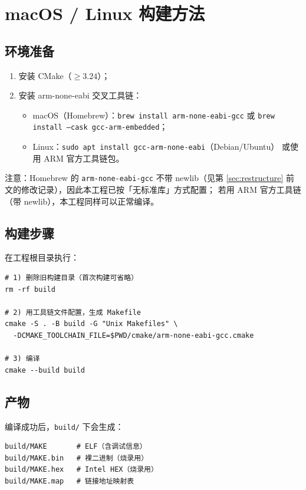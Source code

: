 \section{macOS / Linux 构建方法}

\subsection{环境准备}

\begin{enumerate}
  \item 安装 CMake（$\geq 3.24$）；
  \item 安装 arm-none-eabi 交叉工具链：
    \begin{itemize}
      \item macOS（Homebrew）：\texttt{brew install arm-none-eabi-gcc}
            或 \texttt{brew install --cask gcc-arm-embedded}；
      \item Linux：\texttt{sudo apt install gcc-arm-none-eabi}（Debian/Ubuntu）
            或使用 ARM 官方工具链包。
    \end{itemize}
\end{enumerate}

注意：Homebrew 的 \texttt{arm-none-eabi-gcc} 不带 newlib（见第
\ref{sec:restructure} 前文的修改记录），因此本工程已按「无标准库」方式配置；
若用 ARM 官方工具链（带 newlib），本工程同样可以正常编译。

\subsection{构建步骤}

在工程根目录执行：

\begin{lstlisting}[style=bash]
# 1) 删除旧构建目录（首次构建可省略）
rm -rf build

# 2) 用工具链文件配置，生成 Makefile
cmake -S . -B build -G "Unix Makefiles" \
  -DCMAKE_TOOLCHAIN_FILE=$PWD/cmake/arm-none-eabi-gcc.cmake

# 3) 编译
cmake --build build
\end{lstlisting}

\subsection{产物}

编译成功后，\texttt{build/} 下会生成：

\begin{lstlisting}[style=generic]
build/MAKE       # ELF（含调试信息）
build/MAKE.bin   # 裸二进制（烧录用）
build/MAKE.hex   # Intel HEX（烧录用）
build/MAKE.map   # 链接地址映射表
\end{lstlisting}

